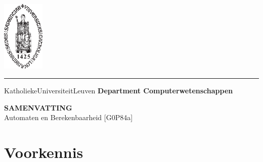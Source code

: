 \documentclass[a4paper]{article}
\begin{document}
\begin{titlepage}
    \newpage
    \thispagestyle{empty}
    \frenchspacing
    \hspace{-0.2cm}
    \includegraphics[height=3.4cm]{assets/sedes}
    \hspace{0.2cm}
    \rule{0.5pt}{3.4cm}
    \hspace{0.2cm}
    \begin{minipage}[b]{8cm}
        \large{Katholieke\newline Universiteit\newline Leuven}\smallskip\newline
        \large{}\smallskip\newline
        \textbf{Department \newline Computerwetenschappen}\smallskip
    \end{minipage}
    \vspace*{3.2cm}\vfill
    \begin{center}
        \begin{minipage}[t]{\textwidth}
            \begin{center}
                \large{\rm{\textbf{\uppercase{Samenvatting}}}}\\
                \large{\rm{Automaten en Berekenbaarheid [G0P84a]}}
            \end{center}
        \end{minipage}
    \end{center}
    \vfill
    \hfill{}
\end{titlepage}

\tableofcontents

\newpage

\section{Voorkennis}
\end{document}
